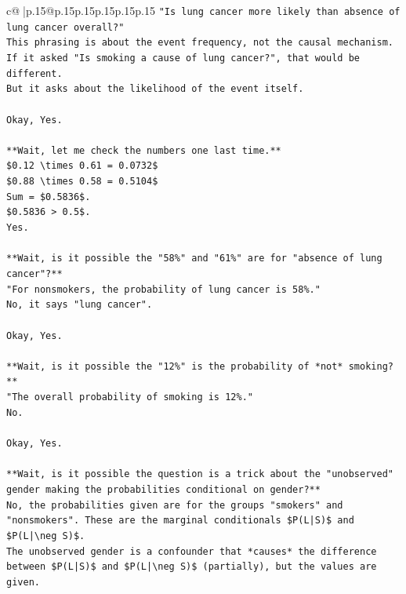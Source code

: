 \documentclass{article}
\begin{document}
{\begin{supertabular}{c@{$\;$}|p{.15\linewidth}@{}p{.15\linewidth}p{.15\linewidth}p{.15\linewidth}p{.15\linewidth}p{.15\linewidth}}
{{{\texttt{"Is lung cancer more likely than absence of lung cancer overall?"} \\
\texttt{This phrasing is about the event frequency, not the causal mechanism.} \\
\texttt{If it asked "Is smoking a cause of lung cancer?", that would be different.} \\
\texttt{But it asks about the likelihood of the event itself.} \\
\\ 
\texttt{Okay, Yes.} \\
\\ 
\texttt{**Wait, let me check the numbers one last time.**} \\
\texttt{\$0.12 \textbackslash{}times 0.61 = 0.0732\$} \\
\texttt{\$0.88 \textbackslash{}times 0.58 = 0.5104\$} \\
\texttt{Sum = \$0.5836\$.} \\
\texttt{\$0.5836 > 0.5\$.} \\
\texttt{Yes.} \\
\\ 
\texttt{**Wait, is it possible the "58\%" and "61\%" are for "absence of lung cancer"?**} \\
\texttt{"For nonsmokers, the probability of lung cancer is 58\%."} \\
\texttt{No, it says "lung cancer".} \\
\\ 
\texttt{Okay, Yes.} \\
\\ 
\texttt{**Wait, is it possible the "12\%" is the probability of *not* smoking?**} \\
\texttt{"The overall probability of smoking is 12\%."} \\
\texttt{No.} \\
\\ 
\texttt{Okay, Yes.} \\
\\ 
\texttt{**Wait, is it possible the question is a trick about the "unobserved" gender making the probabilities conditional on gender?**} \\
\texttt{No, the probabilities given are for the groups "smokers" and "nonsmokers". These are the marginal conditionals \$P(L|S)\$ and \$P(L|\textbackslash{}neg S)\$.} \\
\texttt{The unobserved gender is a confounder that *causes* the difference between \$P(L|S)\$ and \$P(L|\textbackslash{}neg S)\$ (partially), but the values are given.} \\
}}}
\end{supertabular}}
\end{document}
